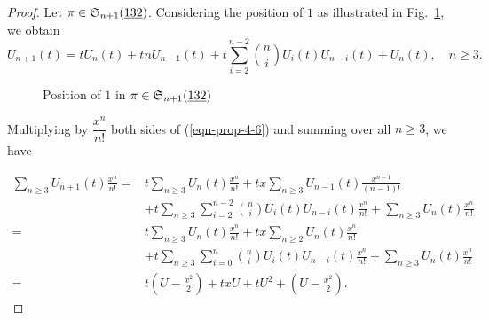 \begin{proof}
    Let $\pi \in \S_{n+1}(\underline{132})$. Considering the position of $1$ as illustrated in Fig.~\ref{fig:position of 1}, we obtain
    \begin{equation}\label{eqn-prop-4-6}U_{n+1}(t)=tU_n(t)+tnU_{n-1}(t)+t\sum_{i=2}^{n-2}\binom{n}{i}U_i(t)U_{n-i}(t)+U_{n}(t),\quad n \ge 3.\end{equation}

    \begin{figure}[ht]
        \centering



        \caption{Position of $1$ in $\pi \in \S_{n+1}(\underline{132})$}\label{fig:position of 1}
    \end{figure}
Multiplying by $\dfrac{x^n}{n!}$ both sides of (\ref{eqn-prop-4-6}) and summing over all $n\geq 3$, we have    

\begin{align*}
    \sum_{n\ge 3}U_{n+1}(t)\frac{x^n}{n!}={}&t\sum_{n\ge 3}U_n(t)\frac{x^n}{n!}+tx\sum_{n\ge 3}U_{n-1}(t)\frac{x^{n-1}}{(n-1)!} \\
    &+t\sum_{n\ge 3}\sum_{i=2}^{n-2}\binom{n}{i}U_i(t)U_{n-i}(t)\frac{x^n}{n!}+\sum_{n\ge 3}U_n(t)\frac{x^n}{n!} \\
    ={}& t\sum_{n\ge 3}U_n(t)\frac{x^n}{n!}+tx\sum_{n\ge 2}U_{n}(t)\frac{x^{n}}{n!} \\
    &+t\sum_{n\ge 3}\sum_{i=0}^{n}\binom{n}{i}U_i(t)U_{n-i}(t)\frac{x^n}{n!}+\sum_{n\ge 3}U_n(t)\frac{x^n}{n!} \\
    ={}& t\left(U-\frac{x^2}{2}\right)+txU+tU^2+\left(U-\frac{x^2}{2}\right).
\end{align*}


\end{proof}
